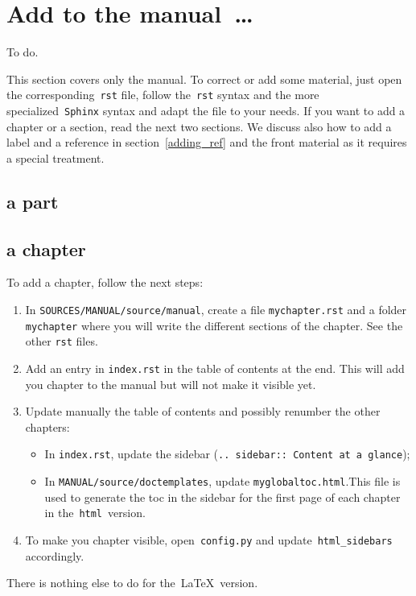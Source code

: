 \documentclass[a4paper,10pt]{article}
\newcommand{\code}[1]{\texttt{#1}}
\begin{document}
\section{Add to the manual~\ldots}
\label{write_documentation}

To do.

This section covers only the manual. To correct or add some material, just open the corresponding~\code{rst} file, follow the~\code{rst} syntax and the more specialized~\code{Sphinx} syntax and adapt the file to your needs. If you want to add a chapter or a section, read the next two sections. We discuss also how to add a label and a reference in section~\ref{adding_ref} and the front material as it requires a special treatment.

\subsection{a part}

\subsection{a chapter}
To add a chapter, follow the next steps:
\begin{enumerate}
 \item In \code{SOURCES/MANUAL/source/manual}, create a file \code{mychapter.rst} and a folder \code{mychapter} where you will write the different sections of the chapter. See the other \code{rst} files.
 \item Add an entry in \code{index.rst} in the table of contents at the end. This will add you chapter to the manual but will not make it visible yet.
 \item Update manually the table of contents and possibly renumber the other chapters:
       \begin{itemize}
        \item In \code{index.rst}, update the sidebar (\code{.. sidebar:: Content at a glance});
        \item In \code{MANUAL/source/doctemplates}, update \code{myglobaltoc.html}.This file is used to generate the toc in the sidebar for the first page of each chapter in the~\code{html}~version.
       \end{itemize}
 \item To make you chapter visible, open~\code{config.py} and update~\code{html\_sidebars} accordingly.
\end{enumerate}

There is nothing else to do for the~\LaTeX\ version.
\end{document}

